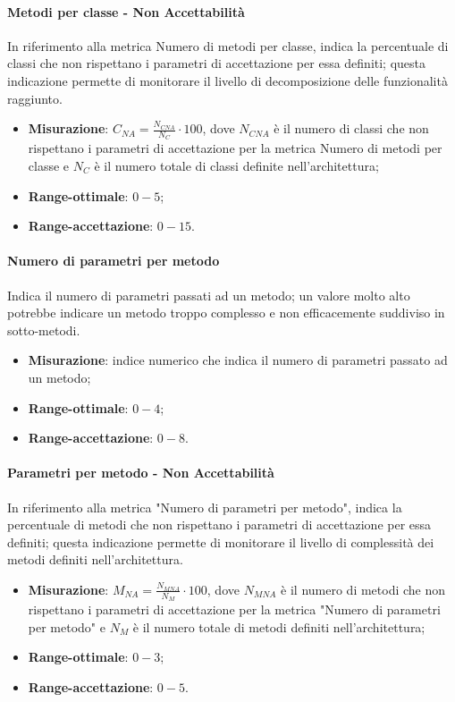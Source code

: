\paragraph{Metodi per classe - Non Accettabilità}
\label{numMetodiClasseNA}
In riferimento alla metrica Numero di metodi per classe, indica la percentuale di classi che non rispettano i parametri di accettazione per essa definiti; questa indicazione permette di monitorare il livello di decomposizione delle funzionalità raggiunto.
\begin{itemize}
\item \textbf{Misurazione}: $C_{NA}=\frac{N_{CNA}}{N_{C}} \cdot 100$, dove $N_{CNA}$ è il numero di classi che non rispettano i parametri di accettazione per la metrica Numero di metodi per classe e $N_{C}$ è il numero totale di classi definite nell'architettura;
\item \textbf{Range-ottimale}: $0 - 5$;
\item \textbf{Range-accettazione}: $0 - 15$.
\end{itemize}
\paragraph{Numero di parametri per metodo}
Indica il numero di parametri passati ad un metodo; un valore molto alto potrebbe indicare un metodo troppo complesso e non efficacemente suddiviso in sotto-metodi.
\begin{itemize}
\item \textbf{Misurazione}: indice numerico che indica il numero di parametri passato ad un metodo;
\item \textbf{Range-ottimale}: $0 - 4$;
\item \textbf{Range-accettazione}: $0 - 8$.
\end{itemize}
\paragraph{Parametri per metodo - Non Accettabilità}
\label{numParMetodoNA}
In riferimento alla metrica "Numero di parametri per metodo", indica la percentuale di metodi che non rispettano i parametri di accettazione per essa definiti; questa indicazione permette di monitorare il livello di complessità dei metodi definiti nell'architettura.
\begin{itemize}
\item \textbf{Misurazione}: $M_{NA}=\frac{N_{MNA}}{N_{M}} \cdot 100$, dove $N_{MNA}$ è il numero di metodi che non rispettano i parametri di accettazione per la metrica "Numero di parametri per metodo" e $N_{M}$ è il numero totale di metodi definiti nell'architettura;
\item \textbf{Range-ottimale}: $0 - 3$;
\item \textbf{Range-accettazione}: $0 - 5$.
\end{itemize}
